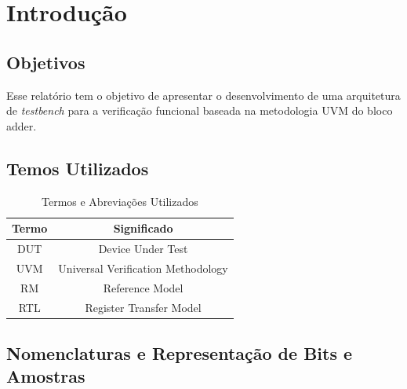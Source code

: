 \documentclass[a4paper]{article}
\begin{document}
\begin{versionhistory}
\end{versionhistory}

\newpage

\tableofcontents

\newpage

\listoffigures

\newpage

\listoftables

\newpage



\section{Introdução}
\subsection{Objetivos}

\par
Esse relatório tem o objetivo de apresentar o desenvolvimento de uma arquitetura de \textit{testbench} para a verificação funcional baseada na metodologia UVM do bloco adder.

\subsection{Temos Utilizados}

\begin{table}[h]
\caption{Termos e Abreviações Utilizados}
\centering
\begin{tabular}{|c|c|}
\hline
\rowcolor[HTML]{27378F} 
{\color[HTML]{FFFFFF} Termo} & {\color[HTML]{FFFFFF} Significado} \\ \hline
DUT                          & Device Under Test                  \\ \hline
UVM                          & Universal Verification Methodology \\ \hline
RM                           & Reference Model                    \\ \hline
RTL                          & Register Transfer Model            \\ \hline
\end{tabular}
\end{table}


\subsection{Nomenclaturas e Representação de Bits e Amostras}
\end{document}
